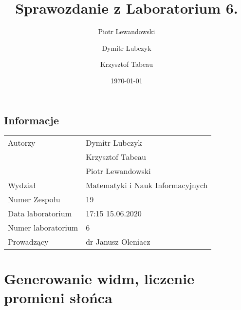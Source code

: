 \documentclass{article}
\title{Sprawozdanie z Laboratorium 6.}
\author{Piotr Lewandowski \and Dymitr Lubczyk \and Krzysztof Tabeau }
\date{\today}
\begin{document}
\maketitle
\subsection{Informacje}
\begin{tabular}{|l|l|}
\hline
Autorzy             & Dymitr Lubczyk                    \\
                    & Krzysztof Tabeau                  \\
                    & Piotr Lewandowski                 \\
Wydział             & Matematyki i Nauk Informacyjnych  \\
Numer Zespołu       & 19                                \\
Data laboratorium   & 17:15 15.06.2020                  \\
Numer laboratorium  & 6                                 \\
Prowadzący          & dr Janusz Oleniacz                \\
\hline
\end{tabular}



\clearpage
\section{Generowanie widm, liczenie promieni słońca}
\end{document}
